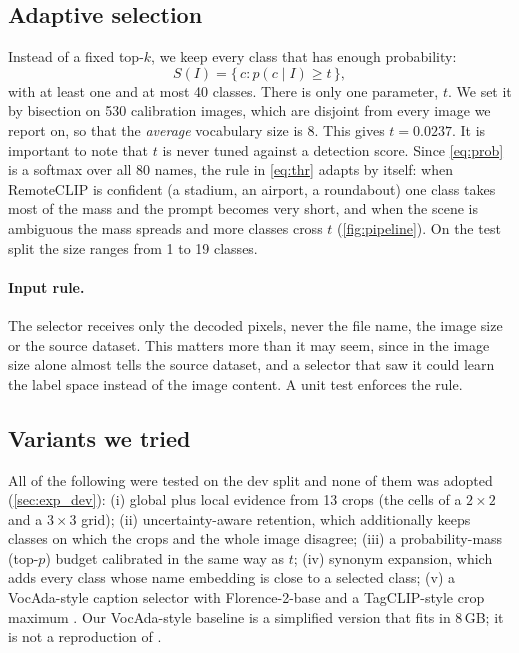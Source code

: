 \subsection{Adaptive selection}
Instead of a fixed top-$k$, we keep every class that has enough probability:
\begin{equation}
  S(I) = \{\,c : p(c\mid I) \geq t\,\},
  \label{eq:thr}
\end{equation}
with at least one and at most 40 classes.
There is only one parameter, $t$.
We set it by bisection on 530 calibration images, which are disjoint from every image we report on, so that the \emph{average} vocabulary size is 8. This gives $t=0.0237$.
It is important to note that $t$ is never tuned against a detection score.
Since \cref{eq:prob} is a softmax over all 80 names, the rule in \cref{eq:thr} adapts by itself: when RemoteCLIP is confident (a stadium, an airport, a roundabout) one class takes most of the mass and the prompt becomes very short, and when the scene is ambiguous the mass spreads and more classes cross $t$ (\cref{fig:pipeline}).
On the test split the size ranges from 1 to 19 classes.

\paragraph{Input rule.}
The selector receives only the decoded pixels, never the file name, the image size or the source dataset.
This matters more than it may seem, since in \lae the image size alone almost tells the source dataset, and a selector that saw it could learn the label space instead of the image content.
A unit test enforces the rule.

\subsection{Variants we tried}
All of the following were tested on the dev split and none of them was adopted (\cref{sec:exp_dev}):
(i) global plus local evidence from 13 crops (the cells of a $2{\times}2$ and a $3{\times}3$ grid);
(ii) uncertainty-aware retention, which additionally keeps classes on which the crops and the whole image disagree;
(iii) a probability-mass (top-$p$) budget calibrated in the same way as $t$;
(iv) synonym expansion, which adds every class whose name embedding is close to a selected class;
(v) a VocAda-style caption selector with Florence-2-base \cite{xiao2024florence} and a TagCLIP-style crop maximum \cite{lin2024tagclip}.
Our VocAda-style baseline is a simplified version that fits in 8\,GB; it is not a reproduction of \cite{liu2025vocada}.
